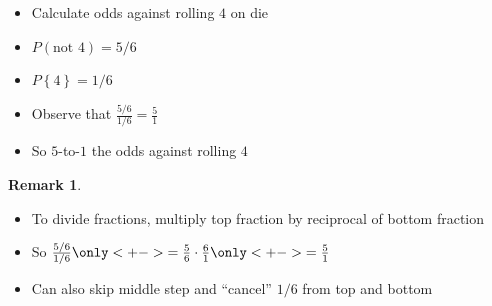 \documentclass{beamer}
\theoremstyle{definition}
\newtheorem{remark}{Remark}
\begin{document}
\begin{frame}
\begin{example}
\begin{itemize}
\item Calculate odds against rolling $4$ on die
\item $P\left(\text{not $4$}\right)=5/6$
\item $P\left\{4\right\}=1/6$
\item Observe that $\frac{5/6}{1/6}=\frac{5}{1}$
\item So $5$-to-$1$ the odds against rolling $4$
\end{itemize}
\end{example}
\begin{remark}
\begin{itemize}
\item To divide fractions, multiply top fraction
by \alert{reciprocal} of bottom fraction
\item So
$\frac{5/6}{1/6}
\only<+->{=\frac{5}{6}\cdot\frac{6}{1}}\only<+->{=\frac{5}{1}}$
\item Can also skip middle step and ``cancel'' $1/6$ from
top and bottom
\end{itemize}
\end{remark}
\end{frame}
\end{document}
